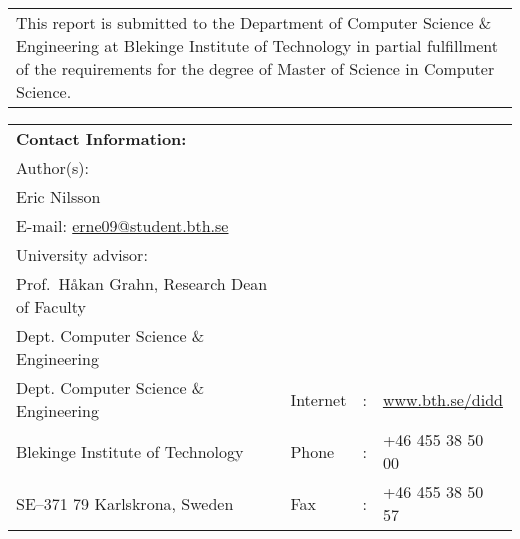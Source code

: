 {\pagestyle{empty}
\changepage{5cm}{1cm}{-0.5cm}{-0.5cm}{}{-2cm}{}{}{}
\noindent%
\begin{tabular}{p{\textwidth}}
{\small This report is submitted to the Department of Computer Science \& Engineering at Blekinge
Institute of Technology in partial fulfillment of the requirements for the degree of Master
of Science in Computer Science.}
\end{tabular}

\par\vspace {12cm}

\noindent%
\begin{tabular}{p{}lcl}
\textbf{Contact Information:}\\
Author(s):\\
Eric Nilsson\\
E-mail: \href{mailto:erne09@student.bth.se}{erne09@student.bth.se} \\ %
\par\vspace {5cm}
University advisor:\\
Prof.\ Håkan Grahn, Research Dean of Faculty\\
Dept. Computer Science \& Engineering

\par\vspace {1cm}

\noindent%
 \\
Dept. Computer Science \& Engineering & Internet & : & \href{http://www.bth.se/didd}{www.bth.se/didd}\\
Blekinge Institute of Technology & Phone	& : & +46 455 38 50 00 \\
SE--371 79 Karlskrona, Sweden & Fax & : & +46 455 38 50 57 \\
\end{tabular}
\clearpage
} %

\setcounter{page}{1}
